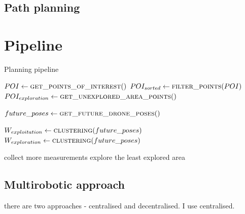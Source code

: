 \subsection{Path planning}




\section{Pipeline}

\begin{algorithm}
\caption{Planning pipeline}\label{alg:cap}
\begin{algorithmic}
  \State $POI \gets \Call{get\_points\_of\_interest}$
  \State $POI_{sorted} \gets \Call{filter\_points}{POI}$
  \State $POI_{exploration} \gets \Call{get\_unexplored\_area\_points}$
  
  \State $future\_poses \gets \Call{get\_future\_drone\_poses}$

  \State $W_{exploitation} \gets \Call{clustering}{future\_poses}$
  \State $W_{exploration} \gets \Call{clustering}{future\_poses}$
  
  \State
\end{algorithmic}
\end{algorithm}


collect more measurements
explore the least explored area

\subsection{Multirobotic approach}
there are two approaches - centralised and decentralised.
I use centralised.


